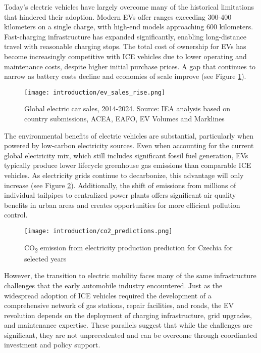 Today's electric vehicles have largely overcome many of the historical limitations that hindered their adoption. Modern EVs offer ranges exceeding 300-400 kilometers on a single charge, with high-end models approaching 600 kilometers. Fast-charging infrastructure has expanded significantly, enabling long-distance travel with reasonable charging stops. The total cost of ownership for EVs has become increasingly competitive with ICE vehicles due to lower operating and maintenance costs, despite higher initial purchase prices. A gap that continues to narrow as battery costs decline and economies of scale improve (see Figure \ref{fig:ev-sales}).


\begin{figure}[h]
    \centering
    \texttt{[image: introduction/ev\_sales\_rise.png]}
    \caption{Global electric car sales, 2014-2024. Source: IEA analysis based on country submissions, ACEA, EAFO, EV Volumes and Marklines \cite{IEA2024}}
    \label{fig:ev-sales}
\end{figure}


The environmental benefits of electric vehicles are substantial, particularly when powered by low-carbon electricity sources. Even when accounting for the current global electricity mix, which still includes significant fossil fuel generation, EVs typically produce lower lifecycle greenhouse gas emissions than comparable ICE vehicles. As electricity grids continue to decarbonize, this advantage will only increase (see Figure \ref{fig:co2_predictions_czechia}). Additionally, the shift of emissions from millions of individual tailpipes to centralized power plants offers significant air quality benefits in urban areas and creates opportunities for more efficient pollution control.

\begin{figure}[h]
    \centering
    \texttt{[image: introduction/co2\_predictions.png]}
    \caption{CO\textsubscript{2} emission  from electricity production prediction for Czechia for selected years \cite{CEPS}}
    \label{fig:co2_predictions_czechia}
\end{figure}

However, the transition to electric mobility faces many of the same infrastructure challenges that the early automobile industry encountered. Just as the widespread adoption of ICE vehicles required the development of a comprehensive network of gas stations, repair facilities, and roads, the EV revolution depends on the deployment of charging infrastructure, grid upgrades, and maintenance expertise. These parallels suggest that while the challenges are significant, they are not unprecedented and can be overcome through coordinated investment and policy support.

